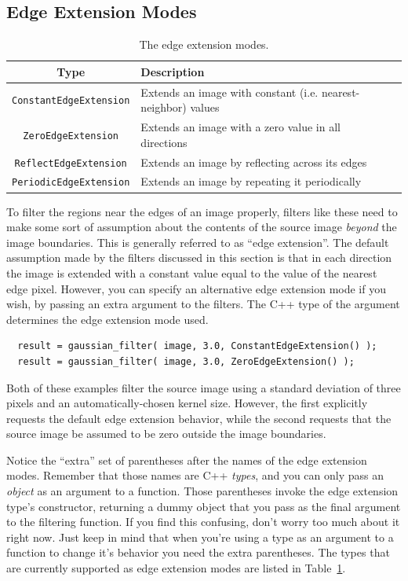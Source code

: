\subsection{Edge Extension Modes}
\label{sec:filter-edge-extend}

\begin{table}[t]\begin{centering}
\begin{tabular}{|c|l|l|} \hline
Type & Description \\ \hline \hline
\verb#ConstantEdgeExtension# & Extends an image with constant (i.e. nearest-neighbor) values \\ \hline
\verb#ZeroEdgeExtension# & Extends an image with a zero value in all directions \\ \hline
\verb#ReflectEdgeExtension# & Extends an image by reflecting across its edges \\ \hline
\verb#PeriodicEdgeExtension# & Extends an image by repeating it periodically \\ \hline
\end{tabular}
\caption{The edge extension modes.}
\label{tbl:edge-extension-modes}
\end{centering}\end{table}

To filter the regions near the edges of an image properly, 
filters like these need to make some sort of assumption 
about the contents of the source image {\it beyond} the 
image boundaries.  This is generally referred to as ``edge 
extension''.  The default assumption made by the filters 
discussed in this section is that in each direction the 
image is extended with a constant value equal to the value 
of the nearest edge pixel.  However, you can specify an 
alternative edge extension mode if you wish, by passing 
an extra argument to the filters.  The C++ type of the 
argument determines the edge extension mode used.  
\begin{verbatim}
  result = gaussian_filter( image, 3.0, ConstantEdgeExtension() );
  result = gaussian_filter( image, 3.0, ZeroEdgeExtension() );
\end{verbatim}
Both of these examples filter the source image using a 
standard deviation of three pixels and an automatically-chosen 
kernel size.  However, the first explicitly requests the 
default edge extension behavior, while the second requests 
that the source image be assumed to be zero outside the 
image boundaries.

Notice the ``extra'' set of parentheses after the names 
of the edge extension modes.  Remember that those names are 
C++ {\it types}, and you can only pass an {\it object} as an 
argument to a function.  Those parentheses invoke the 
edge extension type's constructor, returning a dummy 
object that you pass as the final argument to the filtering 
function.  If you find this confusing, don't worry too much 
about it right now.  Just keep in mind that when you're 
using a type as an argument to a function to change it's 
behavior you need the extra parentheses.  The types that 
are currently supported as edge extension modes are listed 
in Table~\ref{tbl:edge-extension-modes}.

